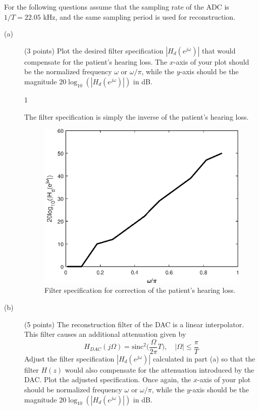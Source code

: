 \documentclass[10pt]{article}
\def\SOLUTIONS{1} %
\def\SolutionsColor{red2}
\begin{document}
For the following questions assume that the sampling rate of the ADC is $1/T = 22.05$ kHz, and the same sampling period is used for reconstruction.
\begin{description}
	\item[(a)] (3 points) Plot the desired filter specification $|H_d(e^{j\omega})|$ that would compensate for the patient's hearing loss. The $x$-axis of your plot should be the normalized frequency $\omega$ or $\omega/\pi$, while the $y$-axis should be the magnitude $20\log_{10}(|H_d(e^{j\omega})|)$ in dB.
	
	\if\SOLUTIONS1
	{\color{\SolutionsColor} The filter specification is simply the inverse of the patient's hearing loss.
	
	\FloatBarrier
	\begin{figure}[h!]
		\centering
		\includegraphics[scale=0.6]{figs/hearing_aid_spec.eps}
		\caption{Filter specification for correction of the patient's hearing loss.}
	\end{figure}
	\FloatBarrier
	}
	\fi
	
	\item[(b)] (5 points) The reconstruction filter of the DAC is a linear interpolator. This filter causes an additional attenuation given by
	\begin{equation}
		H_{DAC}(j\Omega) = \mathrm{sinc}^2\Big(\frac{\Omega}{2\pi}T\Big), \quad |\Omega| \leq \frac{\pi}{T}
	\end{equation}
	Adjust the filter specification $|H_d(e^{j\omega})|$ calculated in part (a) so that the filter $H(z)$ would also compensate for the attenuation introduced by the DAC. Plot the adjusted specification. Once again, the $x$-axis of your plot should be normalized frequency $\omega$ or $\omega/\pi$, while the $y$-axis should be the magnitude $20\log_{10}(|H_d(e^{j\omega})|)$ in dB.
	

\end{description}
\end{document}
